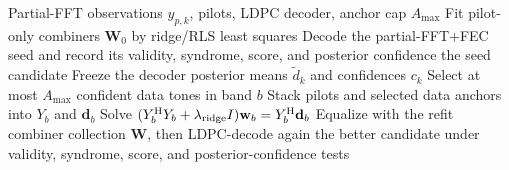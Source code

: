\documentclass[11pt]{article}
\newcommand{\juna}{JUNA}
\begin{document}
\begin{algorithm}[t]
\caption{\juna{} lite posterior-anchor refit}
\begin{algorithmic}[1]
\Require Partial-FFT observations \(y_{p,k}\), pilots, LDPC decoder, anchor cap \(A_{\max}\)
\State Fit pilot-only combiners \(\mathbf W_0\) by ridge/RLS least squares
\State Decode the partial-FFT+FEC seed and record its validity, syndrome, score, and posterior confidence
  \State \Return the seed candidate
\EndIf
\State Freeze the decoder posterior means \(\widetilde d_k\) and confidences \(c_k\)
  \State Select at most \(A_{\max}\) confident data tones in band \(b\)
  \State Stack pilots and selected data anchors into \(Y_b\) and \(\mathbf d_b\)
  \State Solve \((Y_b^{\mathrm H}Y_b+\lambda_{\rm ridge}I)\mathbf w_b
        =Y_b^{\mathrm H}\mathbf d_b\)
\EndFor
\State Equalize with the refit combiner collection \(\mathbf W\), then LDPC-decode again
\State \Return the better candidate under validity, syndrome, score, and posterior-confidence tests
\end{algorithmic}
\end{algorithm}
\end{document}
